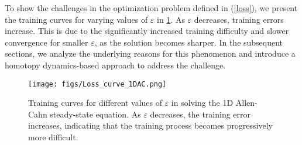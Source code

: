 To show the challenges in the optimization problem defined in (\ref{loss}), we present the training curves for varying values of \(\varepsilon\) in \cref{fig:1d_allen_cahn_pinn_loss}. As \(\varepsilon\) decreases, training errors increase. This is due to the significantly increased training difficulty and slower convergence for smaller \(\varepsilon\), as the solution becomes sharper. In the subsequent sections, we analyze the underlying reasons for this phenomenon and introduce a homotopy dynamics-based approach to address the challenge.

\begin{figure}[t]
    \centering
    \texttt{[image: figs/Loss\_curve\_1DAC.png]}
    \caption{Training curves for different values of \(\varepsilon\) in solving the 1D Allen-Cahn steady-state equation. As \(\varepsilon\) decreases, the training error increases, indicating that the training process becomes progressively more difficult.}
    \label{fig:1d_allen_cahn_pinn_loss}
\end{figure}



